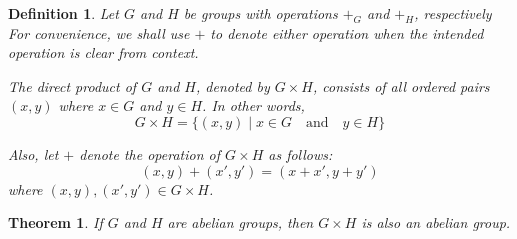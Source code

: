 \documentclass{article}
\newtheorem{definition}{Definition}
\newtheorem{theorem}{Theorem}
\begin{document}
\begin{definition}
Let $G$ and $H$ be groups with operations $+_G$ and $+_H$, respectively
For convenience, we shall use $+$ to denote either operation when
the intended operation is clear from context.

The direct product of $G$ and $H$,
denoted by $G \times H$, consists of all ordered pairs $(x,y)$
where $x \in G$ and $y \in H$. In other words,
\[
G \times H = \{(x,y) \mid x \in G \quad \text{and} \quad y \in H\}
\]

Also, let $+$ denote the operation of $G \times H$ as follows:
\[
(x,y) + (x',y') = (x+x',y+y')
\]
where $(x,y),(x',y') \in G \times H$.
\end{definition}

\begin{theorem}
If $G$ and $H$ are abelian groups, then $G \times H$ is also
an abelian group.
\end{theorem}
\end{document}
